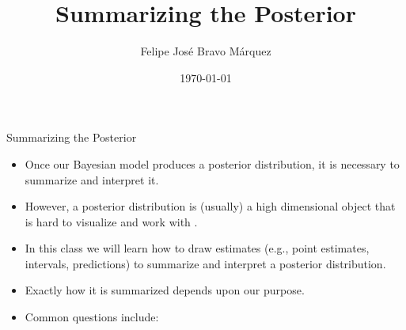 \documentclass[handout]{beamer}
\title{Summarizing the Posterior}
\author[Felipe Bravo Márquez]{\footnotesize
 \textcolor[rgb]{0.00,0.00,1.00}{Felipe José Bravo Márquez}}
\date{ \today }
\begin{document}
\begin{frame}
\titlepage


\end{frame}




\begin{frame}{Summarizing the Posterior}
\scriptsize{
\begin{itemize}

\item Once our Bayesian model produces a posterior distribution, it is necessary to summarize and interpret it.

\item However, a posterior distribution is (usually) a high dimensional object that is hard to visualize and work with \cite{pml1Book}.

\item In this class we will learn how to draw estimates (e.g., point estimates, intervals, predictions) to summarize and interpret a posterior distribution.



\item Exactly how it is summarized depends upon our purpose.

\item Common questions include:
\begin{itemize}
\end{itemize}
 
\end{itemize}



} 

\end{frame}
\end{document}
